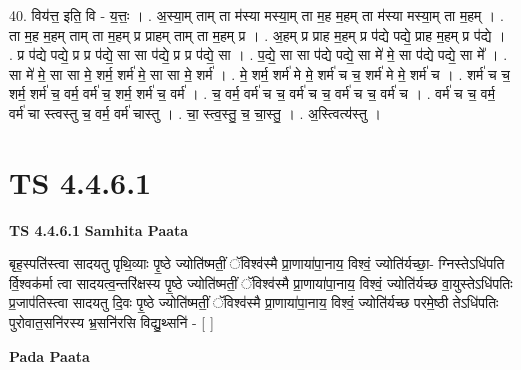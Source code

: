 \documentclass[17pt]{extarticle}
\begin{document}
40. विय॑त्त॒ इति॒ वि - य॒त्तः॒ । . अ॒स्या॒म् ताम् ता म॑स्या मस्या॒म् ता म॒ह म॒हम् ता म॑स्या मस्या॒म् ता म॒हम् । . ता म॒ह म॒हम् ताम् ता म॒हम् प्र प्राहम् ताम् ता म॒हम् प्र । . अ॒हम् प्र प्राह म॒हम् प्र प॑द्ये पद्ये॒ प्राह म॒हम् प्र प॑द्ये । . प्र प॑द्ये पद्ये॒ प्र प्र प॑द्ये॒ सा सा प॑द्ये॒ प्र प्र प॑द्ये॒ सा । . प॒द्ये॒ सा सा प॑द्ये पद्ये॒ सा मे॑ मे॒ सा प॑द्ये पद्ये॒ सा मे᳚ । . सा मे॑ मे॒ सा सा मे॒ शर्म॒ शर्म॑ मे॒ सा सा मे॒ शर्म॑ । . मे॒ शर्म॒ शर्म॑ मे मे॒ शर्म॑ च च॒ शर्म॑ मे मे॒ शर्म॑ च । . शर्म॑ च च॒ शर्म॒ शर्म॑ च॒ वर्म॒ वर्म॑ च॒ शर्म॒ शर्म॑ च॒ वर्म॑ । . च॒ वर्म॒ वर्म॑ च च॒ वर्म॑ च च॒ वर्म॑ च च॒ वर्म॑ च । . वर्म॑ च च॒ वर्म॒ वर्म॑ चा स्त्वस्तु च॒ वर्म॒ वर्म॑ चास्तु । . चा॒ स्त्व॒स्तु॒ च॒ चा॒स्तु॒ । . अ॒स्त्वित्य॑स्तु । \newline
\pagebreak
{}

\section{ TS 4.4.6.1 }

\textbf{TS 4.4.6.1 } \newline
\textbf{Samhita Paata} \newline

बृह॒स्पति॑स्त्वा सादयतु पृथि॒व्याः पृ॒ष्ठे ज्योति॑ष्मतीं॒ ॅविश्व॑स्मै प्रा॒णाया॑पा॒नाय॒ विश्वं॒ ज्योति॑र्यच्छा॒- ग्निस्तेऽधि॑पति र्वि॒श्वक॑र्मा त्वा सादयत्व॒न्तरि॑क्षस्य पृ॒ष्ठे ज्योति॑ष्मतीं॒ ॅविश्व॑स्मै प्रा॒णाया॑पा॒नाय॒ विश्वं॒ ज्योति॑र्यच्छ वा॒युस्तेऽधि॑पतिः प्र॒जाप॑तिस्त्वा सादयतु दि॒वः पृ॒ष्ठे ज्योति॑ष्मतीं॒ ॅविश्व॑स्मै प्रा॒णाया॑पा॒नाय॒ विश्वं॒ ज्योति॑र्यच्छ परमे॒ष्ठी तेऽधि॑पतिः पुरोवात॒सनि॑रस्य भ्र॒सनि॑रसि विद्यु॒थ्सनि॑ - [  ] \newline

\textbf{Pada Paata} \newline
\end{document}
